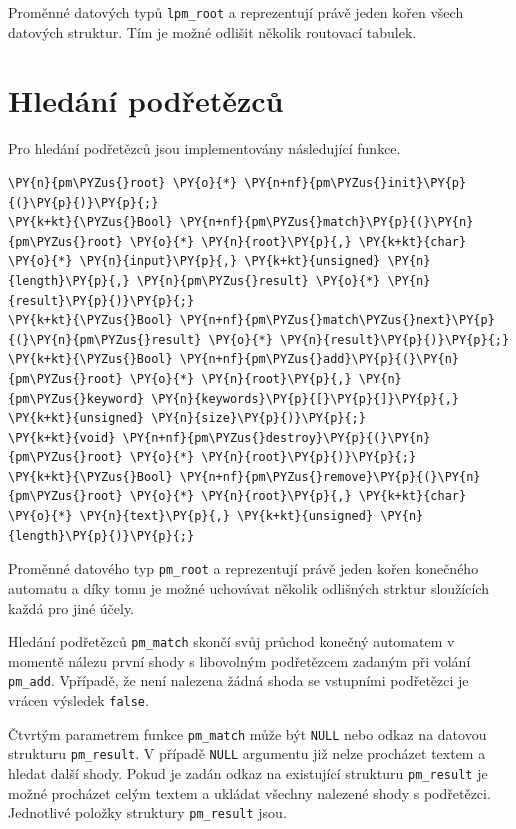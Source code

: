 Proměnné datových typů \texttt{lpm\_root} a  reprezentují právě jeden kořen
všech datových struktur. Tím je možné odlišit několik routovací tabulek.


\section{Hledání podřetězců}
Pro hledání podřetězců jsou implementovány následující funkce.

\begin{Verbatim}[commandchars=\\\{\}]
\PY{n}{pm\PYZus{}root} \PY{o}{*} \PY{n+nf}{pm\PYZus{}init}\PY{p}{(}\PY{p}{)}\PY{p}{;}
\PY{k+kt}{\PYZus{}Bool} \PY{n+nf}{pm\PYZus{}match}\PY{p}{(}\PY{n}{pm\PYZus{}root} \PY{o}{*} \PY{n}{root}\PY{p}{,} \PY{k+kt}{char} \PY{o}{*} \PY{n}{input}\PY{p}{,} \PY{k+kt}{unsigned} \PY{n}{length}\PY{p}{,} \PY{n}{pm\PYZus{}result} \PY{o}{*} \PY{n}{result}\PY{p}{)}\PY{p}{;}
\PY{k+kt}{\PYZus{}Bool} \PY{n+nf}{pm\PYZus{}match\PYZus{}next}\PY{p}{(}\PY{n}{pm\PYZus{}result} \PY{o}{*} \PY{n}{result}\PY{p}{)}\PY{p}{;}
\PY{k+kt}{\PYZus{}Bool} \PY{n+nf}{pm\PYZus{}add}\PY{p}{(}\PY{n}{pm\PYZus{}root} \PY{o}{*} \PY{n}{root}\PY{p}{,} \PY{n}{pm\PYZus{}keyword} \PY{n}{keywords}\PY{p}{[}\PY{p}{]}\PY{p}{,} \PY{k+kt}{unsigned} \PY{n}{size}\PY{p}{)}\PY{p}{;}
\PY{k+kt}{void} \PY{n+nf}{pm\PYZus{}destroy}\PY{p}{(}\PY{n}{pm\PYZus{}root} \PY{o}{*} \PY{n}{root}\PY{p}{)}\PY{p}{;}
\PY{k+kt}{\PYZus{}Bool} \PY{n+nf}{pm\PYZus{}remove}\PY{p}{(}\PY{n}{pm\PYZus{}root} \PY{o}{*} \PY{n}{root}\PY{p}{,} \PY{k+kt}{char} \PY{o}{*} \PY{n}{text}\PY{p}{,} \PY{k+kt}{unsigned} \PY{n}{length}\PY{p}{)}\PY{p}{;}
\end{Verbatim}

Proměnné datového typ \texttt{pm\_root} a reprezentují právě jeden kořen konečného automatu a
díky tomu je možné uchovávat několik odlišných strktur sloužících každá pro jiné účely.

Hledání podřetězců \texttt{pm\_match} skončí svůj průchod konečný automatem v momentě nálezu první shody
s libovolným podřetězcem zadaným při volání \texttt{pm\_add}. Vpřípadě, že není nalezena žádná shoda
se vstupními podřetězci je vrácen výsledek \texttt{false}.

Čtvrtým parametrem funkce \texttt{pm\_match} může být \texttt{NULL} nebo odkaz na datovou strukturu
\texttt{pm\_result}. V případě \texttt{NULL} argumentu již nelze procházet textem a hledat další shody.
Pokud je zadán odkaz na existující strukturu \texttt{pm\_result} je možné procházet celým textem a ukládat
všechny nalezené shody s podřetězci. Jednotlivé položky struktury \texttt{pm\_result} jsou.

